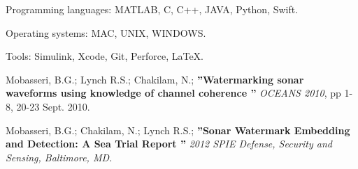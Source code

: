 \documentclass[12pt,a4paper]{article} %
\begin{document}
\inlineheadsection %
{Programming languages:}
{MATLAB, C, C++, JAVA, Python, Swift.}

\inlineheadsection %
{Operating systems:}
{MAC, UNIX, WINDOWS.}

\inlineheadsection %
{Tools:}
{Simulink, Xcode, Git, Perforce, \LaTeX.}



\spacedhrule{1.6em}{-0.4em} %



\inlineheadsection %
{Mobasseri, B.G.; Lynch R.S.; Chakilam, N.;}
{\textbf{''Watermarking sonar waveforms using knowledge of channel coherence ''} \textit{OCEANS 2010}, pp 1-8, 20-23 Sept. 2010.}

\inlineheadsection %
{Mobasseri, B.G.; Chakilam, N.; Lynch R.S.; }
{\textbf{''Sonar Watermark Embedding and Detection: A Sea Trial Report ''} \textit{2012 SPIE Defense, Security and Sensing, Baltimore, MD.}}
\end{document}
